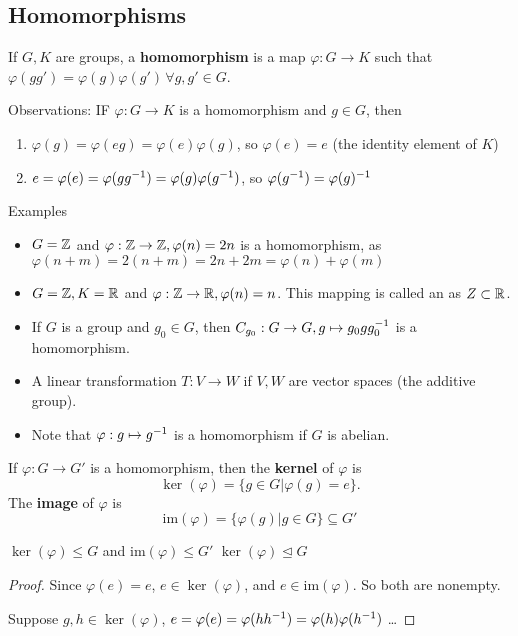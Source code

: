 \documentclass[a4paper]{article}
\begin{document}
\subsection{Homomorphisms}
\begin{definition}[Homomorphism]
    If $G,K$ are groups, a \textbf{homomorphism} is a map $\varphi:G\to K$ such that $\varphi(gg')=\varphi(g)\varphi(g')\,\forall g,g'\in G$.
\end{definition}
Observations: IF $\varphi:G\to K$ is a homomorphism and $g\in G$, then
\begin{enumerate}
    \item $\varphi(g)=\varphi(eg)=\varphi(e)\varphi(g)$, so $\varphi(e)=e$ (the identity element of $K$)
    \item $e=\varphi(e)=\varphi(gg^{-1})=\varphi(g)\varphi(g^{-1})$, so $\varphi(g^{-1})=\varphi(g)^{-1}$
\end{enumerate}
Examples
\begin{itemize}
    \item $G=\mathbb{Z}$ and $\varphi:\mathbb{Z}\to\mathbb{Z}, \varphi(n)=2n$ is a homomorphism, as $\varphi(n+m)=2(n+m)=2n+2m=\varphi(n)+\varphi(m)$
    \item $G=\mathbb{Z},K=\mathbb{R}$ and $\varphi:\mathbb{Z}\to\mathbb{R},\varphi(n)=n$. This mapping is called an  as $Z\subset\mathbb{R}$.
    \item If $G$ is a group and $g_0\in G$, then $C_{g_0}:G\to G,g\mapsto g_0gg_0^{-1}$ is a homomorphism.
    \item A linear transformation $T:V\to W$ if $V,W$ are vector spaces (the additive group). 
    \item Note that $\varphi:g\mapsto g^{-1}$ is  a homomorphism if $G$ is abelian.
\end{itemize}
\begin{definition}
    If $\varphi:G\to G'$ is a homomorphism, then the \textbf{kernel} of $\varphi$ is\begin{equation}
        \ker(\varphi)=\{g\in G|\varphi(g)=e\}.
    \end{equation}
    The \textbf{image} of $\varphi$ is\begin{equation}
        \mathrm{im}(\varphi)=\{\varphi(g)|g\in G\}\subseteq G'
    \end{equation}
\end{definition}
\begin{theorem}
    $\ker(\varphi)\leq G$ and $\mathrm{im}(\varphi)\leq G'$ $\ker(\varphi)\trianglelefteq G$
    \begin{proof}
        Since $\varphi(e)=e$, $e\in\ker(\varphi)$, and $e\in\mathrm{im}(\varphi)$.
        So both are nonempty.

        Suppose $g,h\in\ker(\varphi)$, $e=\varphi(e)=\varphi(hh^{-1})=\varphi(h)\varphi(h^{-1})$ \dots
    \end{proof}
\end{theorem}
\end{document}
